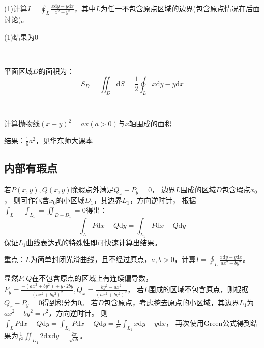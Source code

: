 ~

\begin{exercise}[一道经典题]
  (1)计算$I = \oint _L \frac{x\mathrm{d}y - y\mathrm{d} x }{x^2 + y^2}$，其中$L$为任一不包含原点区域的边界(包含原点情况在后面讨论)。
\end{exercise}

\begin{solution}
  (1)结果为$0$
\end{solution}

~

\begin{theorem}[区域面积转换为曲线积分]
  平面区域$D$的面积为：
  \begin{equation*}
    S_D = \iint_D \mathrm{d} S = \frac{1}{2} \oint _L x\mathrm{d}y - y\mathrm{d} x
  \end{equation*}
\end{theorem}

~

\begin{exercise}[曲面面积应用]
  计算抛物线$(x+y)^2 = ax(a > 0)$与$x$轴围成的面积
\end{exercise}

\begin{solution}
  结果：$\frac{1}{6}a^2$，见华东师大课本
\end{solution}

\subsection{内部有瑕点}

\begin{theorem}[瑕点Green公式]
  若$P(x,y),Q(x,y)$除瑕点外满足$Q_x - P_y = 0$，
  边界$L$围成的区域$D$包含瑕点$x_0$，
  则可作包含$x_0$的小区域$D_1$，其边界$L_1$，方向逆时针，
  根据$\int_L - \int_{L_1} = \iint_{D - D_1} = 0$得出：
  \begin{equation*}
   \int_L P\mathrm{d} x + Q \mathrm{d} y = \int_{L_1} P \mathrm{d} x + Q \mathrm{d} y 
  \end{equation*}
  保证$L_1$曲线表达式的特殊性即可快速计算出结果。
\end{theorem}

\begin{exercise}[最经典题目]
  重点：$L$为简单封闭光滑曲线，且不经过原点，$a,b > 0$，计算$I = \oint _L \frac{x \mathrm{d} y - y\mathrm{d} x}{ax^2 + by^2}$。
\end{exercise}

\begin{solution}
  显然$P,Q$在不包含原点的区域上有连续偏导数，
  $P_y = \frac{-(ax^2 + by^2) + y \cdot 2by}{(ax^2 + by^2)^2}, Q_x = \frac{by^2 - ax^2}{(ax^2 + by^2)^2}$，
  若$L$围成的区域不包含原点，则根据$Q_x - P_y = 0$得到积分为$0$。
  若$D$包含原点，考虑挖去原点的小区域，其边界$L_1$为$ax^2 + by^2 = r^2$，方向逆时针。
  则$\int_L P \mathrm{d} x + Q \mathrm{d} y = \int_{L_1} P \mathrm{d} x + Q \mathrm{d} y = \frac{1}{r^2} \int_{L_1}x\mathrm{d} y - y\mathrm{d} x$，
  再次使用Green公式得到结果为$\frac{1}{r^2}\iint_{D_1}2 \mathrm{d} x \mathrm{d} y = \frac{2\pi}{\sqrt{ab}}$。
\end{solution}


